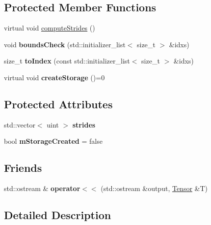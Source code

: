 \subsection*{Protected Member Functions}
\begin{DoxyCompactItemize}
\item 
virtual void \hyperlink{classTensor_a22b23dcd3dbe86924e01d13476f44204}{compute\+Strides} ()
\item 
\mbox{\label{classTensor_aa7505cc7d52a2f7aaac80c28b2ea5ef0}} 
void {\bfseries bounds\+Check} (std\+::initializer\+\_\+list$<$ size\+\_\+t $>$ \&idxs)
\item 
\mbox{\label{classTensor_ac5996704991104f37ca26f6b1795c7ed}} 
size\+\_\+t {\bfseries to\+Index} (const std\+::initializer\+\_\+list$<$ size\+\_\+t $>$ \&idxs)
\item 
\mbox{\label{classTensor_ac552bc5d40c3ac529444bab9a782f3da}} 
virtual void {\bfseries create\+Storage} ()=0
\end{DoxyCompactItemize}
\subsection*{Protected Attributes}
\begin{DoxyCompactItemize}
\item 
\mbox{\label{classTensor_ae7f973176887e0f98ff2c2c4fc5739bf}} 
std\+::vector$<$ uint $>$ {\bfseries strides}
\item 
\mbox{\label{classTensor_a9697400d712e27a4a2d1b0fc4a98eb76}} 
bool {\bfseries m\+Storage\+Created} = false
\end{DoxyCompactItemize}
\subsection*{Friends}
\begin{DoxyCompactItemize}
\item 
\mbox{\label{classTensor_ae78294461d52191aceda3dd148406dcb}} 
std\+::ostream \& {\bfseries operator$<$$<$} (std\+::ostream \&output, \hyperlink{classTensor}{Tensor} \&T)
\end{DoxyCompactItemize}


\subsection{Detailed Description}
